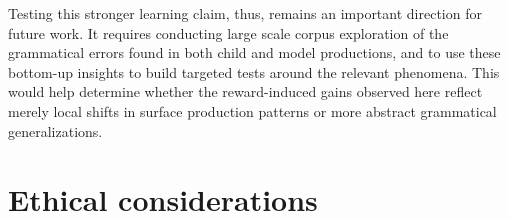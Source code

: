 Testing this stronger learning claim, thus, remains an important direction for future work. It requires conducting large scale corpus exploration of the grammatical errors found in both child and model productions, and to use these bottom-up insights to build targeted tests around the relevant phenomena. This would help determine whether the reward-induced gains observed here reflect merely local shifts in surface production patterns or more abstract grammatical generalizations.










\section*{Ethical considerations}

